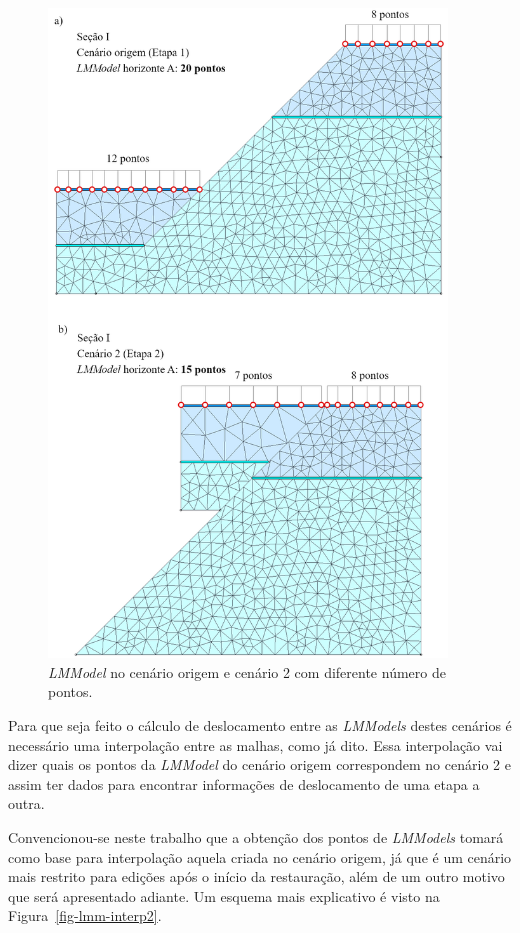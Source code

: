\begin{figure} [H]
  \begin{center}
    \includegraphics[width=300pt]{images/fig-lmm-interp1}
    \caption{\textit{LMModel} no cenário origem e cenário 2 com diferente número de pontos.}\label{fig-lmm-interp1}
  \end{center}
\end{figure}

Para que seja feito o cálculo de deslocamento entre as \textit{LMModels} destes cenários é necessário uma interpolação entre as malhas, como já dito. Essa interpolação vai dizer quais os pontos da \textit{LMModel} do cenário origem correspondem no cenário 2 e assim ter dados para encontrar informações de deslocamento de uma etapa a outra.

Convencionou-se neste trabalho que a obtenção dos pontos de \textit{LMModels} tomará como base para interpolação aquela criada no cenário origem, já que é um cenário mais restrito para edições após o início da restauração, além de um outro motivo que será apresentado adiante. Um esquema mais explicativo é visto na Figura~\ref{fig-lmm-interp2}.

